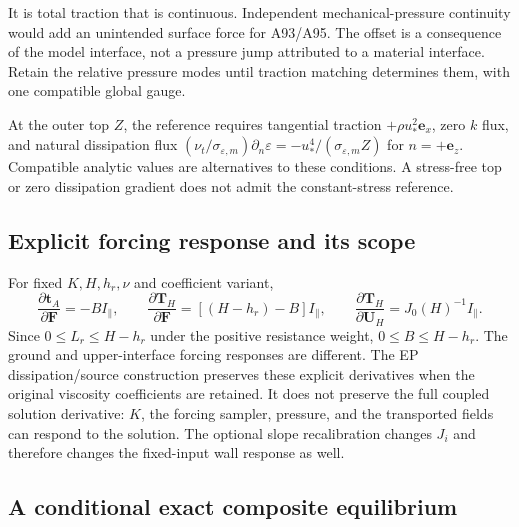 \documentclass[11pt,a4paper]{article}
\numberwithin{equation}{section}
\newcommand{\eps}{\varepsilon}
\newcommand{\ust}{u_*}
\newcommand{\nut}{\nu_t}
\begin{document}
It is total traction that is continuous. Independent mechanical-pressure
continuity would add an unintended surface force for A93/A95.
The offset is a consequence of the model interface, not a pressure
jump attributed to a material interface. Retain the relative pressure
modes until traction matching determines them, with one compatible
global gauge.

At the outer top $Z$, the reference requires tangential traction
$+\rho\ust^2\boldsymbol e_x$, zero $k$ flux, and natural dissipation
flux $(\nut/\sigma_{\eps,m})\partial_n\eps
=-\ust^4/(\sigma_{\eps,m}Z)$ for $n=+\boldsymbol e_z$.
Compatible analytic values are alternatives to these conditions.
A stress-free top or zero dissipation gradient does not admit the
constant-stress reference.


\subsection{Explicit forcing response and its scope}
\label{awf:response}

For fixed $K,H,h_r,\nu$ and coefficient variant,
\begin{equation}
 \frac{\partial\boldsymbol t_A}{\partial\boldsymbol F}=-BI_\parallel,
 \qquad
 \frac{\partial\boldsymbol T_H}{\partial\boldsymbol F}
 =[(H-h_r)-B]I_\parallel,
 \qquad
 \frac{\partial\boldsymbol T_H}{\partial\boldsymbol U_H}
 =J_0(H)^{-1}I_\parallel.
 \label{awf:frozen-response}
\end{equation}
Since $0\le L_r\le H-h_r$ under the positive resistance weight,
$0\le B\le H-h_r$. The ground and upper-interface forcing responses
are different. The EP dissipation/source construction preserves these
explicit derivatives when the original viscosity coefficients are
retained. It does not preserve the full coupled solution derivative:
$K$, the forcing sampler, pressure, and the transported fields can
respond to the solution. The optional slope recalibration changes
$J_i$ and therefore changes the fixed-input wall response as well.

\subsection{A conditional exact composite equilibrium}
\label{awf:equilibrium-theorem}
\end{document}
